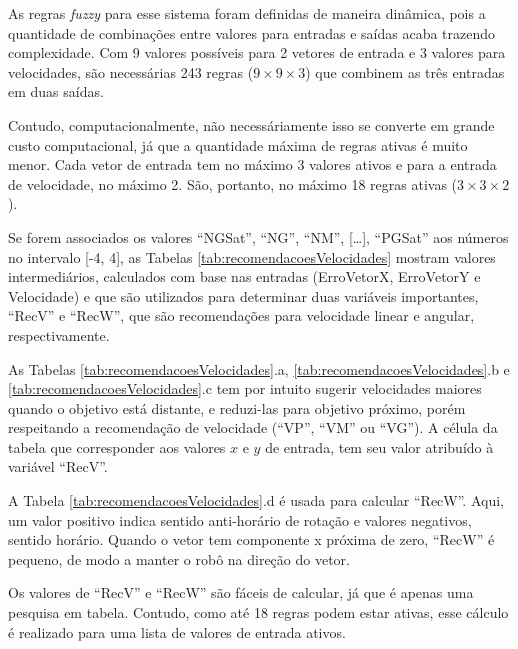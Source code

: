 	As regras \textit{fuzzy} para esse sistema foram definidas de maneira dinâmica, pois a 
	quantidade de combinações entre valores para entradas e saídas acaba trazendo complexidade.
	Com 9 valores possíveis para 2 vetores de entrada e 3 valores para velocidades, são
	necessárias 243 regras ($9\times9\times3$) que combinem as três entradas em duas saídas.
	
	Contudo, computacionalmente, não necessáriamente isso se converte em grande custo 
	computacional, já que a quantidade máxima de regras ativas é muito menor. Cada vetor de
	entrada tem no máximo 3 valores ativos e para a entrada de velocidade, no máximo 2. São,
	portanto, no máximo 18 regras ativas ($3\times3\times2$).
	
	Se forem associados os valores ``NGSat'', ``NG'', ``NM'', [\dots], ``PGSat'' aos números 
	no intervalo [-4, 4], as Tabelas \ref{tab:recomendacoesVelocidades} mostram valores
	intermediários, calculados com base nas entradas (ErroVetorX, ErroVetorY e Velocidade) e 
	que são utilizados para determinar duas variáveis importantes, ``RecV'' e ``RecW'', que 
	são recomendações para velocidade linear e angular, respectivamente. 
	
	
	
	As Tabelas \ref{tab:recomendacoesVelocidades}.a, \ref{tab:recomendacoesVelocidades}.b e 
	\ref{tab:recomendacoesVelocidades}.c tem por intuito sugerir velocidades maiores quando 
	o objetivo está distante, e reduzi-las para objetivo próximo, porém respeitando a 
	recomendação de velocidade (``VP'', ``VM'' ou ``VG''). A célula da tabela que corresponder
	aos valores $x$ e $y$ de entrada, tem seu valor atribuído à variável ``RecV''. 
	
	A Tabela \ref{tab:recomendacoesVelocidades}.d é usada para calcular ``RecW''. Aqui, um valor
	positivo indica sentido anti-horário de rotação e valores negativos, sentido horário. Quando
	o vetor tem componente x próxima de zero, ``RecW'' é pequeno, de modo a manter o robô na
	direção do vetor.
	
	Os valores de ``RecV'' e ``RecW'' são fáceis de calcular, já que é apenas uma pesquisa em 
	tabela. Contudo, como até 18 regras podem estar ativas, esse cálculo é realizado para uma 
	lista de valores de entrada ativos. 
	
